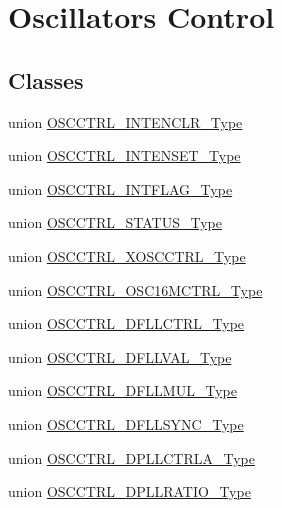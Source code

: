 \hypertarget{group___s_a_m_l21___o_s_c_c_t_r_l}{}\section{Oscillators Control}
\label{group___s_a_m_l21___o_s_c_c_t_r_l}
\subsection*{Classes}
\begin{DoxyCompactItemize}
\item 
union \hyperlink{union_o_s_c_c_t_r_l___i_n_t_e_n_c_l_r___type}{O\+S\+C\+C\+T\+R\+L\+\_\+\+I\+N\+T\+E\+N\+C\+L\+R\+\_\+\+Type}
\item 
union \hyperlink{union_o_s_c_c_t_r_l___i_n_t_e_n_s_e_t___type}{O\+S\+C\+C\+T\+R\+L\+\_\+\+I\+N\+T\+E\+N\+S\+E\+T\+\_\+\+Type}
\item 
union \hyperlink{union_o_s_c_c_t_r_l___i_n_t_f_l_a_g___type}{O\+S\+C\+C\+T\+R\+L\+\_\+\+I\+N\+T\+F\+L\+A\+G\+\_\+\+Type}
\item 
union \hyperlink{union_o_s_c_c_t_r_l___s_t_a_t_u_s___type}{O\+S\+C\+C\+T\+R\+L\+\_\+\+S\+T\+A\+T\+U\+S\+\_\+\+Type}
\item 
union \hyperlink{union_o_s_c_c_t_r_l___x_o_s_c_c_t_r_l___type}{O\+S\+C\+C\+T\+R\+L\+\_\+\+X\+O\+S\+C\+C\+T\+R\+L\+\_\+\+Type}
\item 
union \hyperlink{union_o_s_c_c_t_r_l___o_s_c16_m_c_t_r_l___type}{O\+S\+C\+C\+T\+R\+L\+\_\+\+O\+S\+C16\+M\+C\+T\+R\+L\+\_\+\+Type}
\item 
union \hyperlink{union_o_s_c_c_t_r_l___d_f_l_l_c_t_r_l___type}{O\+S\+C\+C\+T\+R\+L\+\_\+\+D\+F\+L\+L\+C\+T\+R\+L\+\_\+\+Type}
\item 
union \hyperlink{union_o_s_c_c_t_r_l___d_f_l_l_v_a_l___type}{O\+S\+C\+C\+T\+R\+L\+\_\+\+D\+F\+L\+L\+V\+A\+L\+\_\+\+Type}
\item 
union \hyperlink{union_o_s_c_c_t_r_l___d_f_l_l_m_u_l___type}{O\+S\+C\+C\+T\+R\+L\+\_\+\+D\+F\+L\+L\+M\+U\+L\+\_\+\+Type}
\item 
union \hyperlink{union_o_s_c_c_t_r_l___d_f_l_l_s_y_n_c___type}{O\+S\+C\+C\+T\+R\+L\+\_\+\+D\+F\+L\+L\+S\+Y\+N\+C\+\_\+\+Type}
\item 
union \hyperlink{union_o_s_c_c_t_r_l___d_p_l_l_c_t_r_l_a___type}{O\+S\+C\+C\+T\+R\+L\+\_\+\+D\+P\+L\+L\+C\+T\+R\+L\+A\+\_\+\+Type}
\item 
union \hyperlink{union_o_s_c_c_t_r_l___d_p_l_l_r_a_t_i_o___type}{O\+S\+C\+C\+T\+R\+L\+\_\+\+D\+P\+L\+L\+R\+A\+T\+I\+O\+\_\+\+Type}

\end{DoxyCompactItemize}
